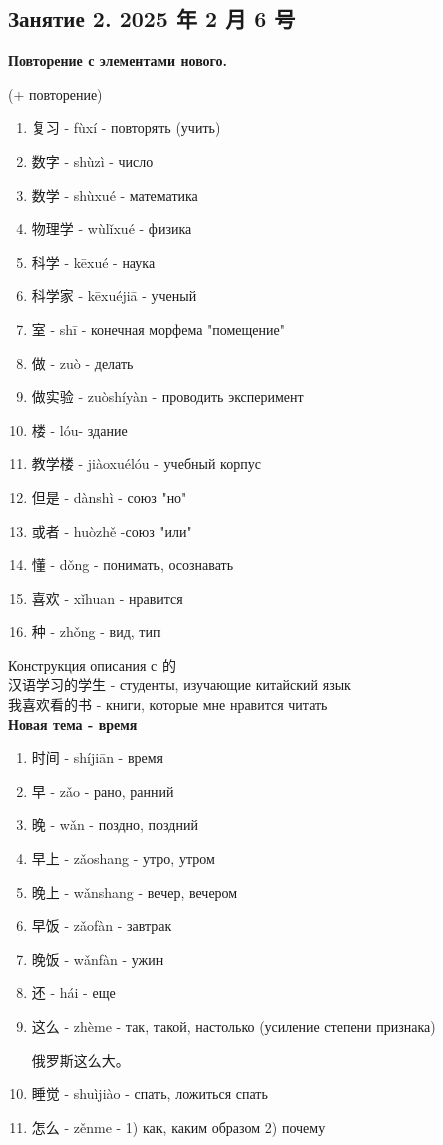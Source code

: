\newpage
\subsection{Занятие 2. 2025 年 2 月 6 号}
\LARGE
\textbf{Повторение с элементами нового.}
\begin{newwords}
	(+ повторение)
	\begin{enumerate}
		\item 复习 - fùxí - повторять (учить)
		\item 数字 - shùzì - число
		\item 数学 - shùxué - математика
		\item 物理学 -  wùlǐxué - физика
		\item 科学 -  kēxué - наука
		\item 科学家 - kēxuéjiā - ученый
		\item 室 - shī - конечная морфема "помещение"
		\item 做 - zuò - делать
		\item 做实验 - zuòshíyàn - проводить эксперимент
		\item 楼 - lóu- здание
		\item 教学楼 - jiàoxuélóu - учебный корпус
		\item 但是 - dànshì - союз "но"
		\item 或者 - huòzhě -союз "или"
		\item 懂 - dǒng - понимать, осознавать
		\item 喜欢 - xǐhuan - нравится
		\item 种 - zhǒng - вид, тип
	\end{enumerate}
\end{newwords}
Конструкция описания с 的\\
汉语学习的学生 - студенты, изучающие китайский язык\\
我喜欢看的书 - книги, которые мне нравится читать\\
\newpage
\textbf{Новая тема - время}
\begin{newwords}\hfill
	\begin{enumerate}
		\item 时间 - shíjiān - время
		\item 早 - zǎo - рано, ранний
		\item 晚 - wǎn - поздно, поздний
		\item 早上 - zǎoshang - утро, утром
		\item 晚上 - wǎnshang - вечер, вечером
		\item 早饭 - zǎofàn - завтрак
		\item 晚饭 - wǎnfàn - ужин
		\item 还 - hái - еще
		\item 这么 - zhème - так, такой, настолько (усиление степени признака)
		\begin{example}
			俄罗斯这么大。
		\end{example}
		\item 睡觉 - shuìjiào - спать, ложиться спать
		\item 怎么 - zěnme - 1) как, каким образом  2) почему
	\end{enumerate}
\end{newwords}
